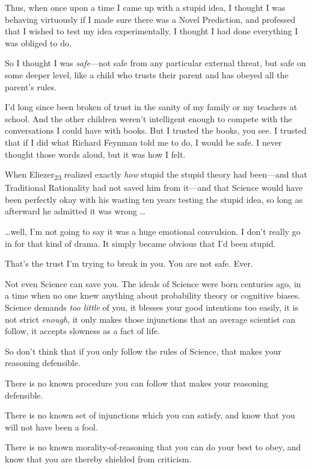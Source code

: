 {
 Thus, when once upon a time I came up with a stupid idea, I
thought I was behaving virtuously if I made sure there was a Novel
Prediction, and professed that I wished to test my idea experimentally.
I thought I had done everything I was obliged to do.}

{
 So I thought I was \textit{safe}{}---not safe from any particular
external threat, but safe on some deeper level, like a child who trusts
their parent and has obeyed all the parent's rules.}

{
 I'd long since been broken of trust in the sanity
of my family or my teachers at school. And the other children
weren't intelligent enough to compete with the
conversations I could have with books. But I trusted the books, you
see. I trusted that if I did what Richard Feynman told me to do, I
would be safe. I never thought those words aloud, but it was how I
felt.}

{
 When Eliezer\textsubscript{23} realized exactly \textit{how}
stupid the stupid theory had been---and that Traditional Rationality
had not saved him from it---and that Science would have been perfectly
okay with his wasting ten years testing the stupid idea, so long as
afterward he admitted it was wrong \ldots}

{
 \ldots well, I'm not going to say it was a huge
emotional convulsion. I don't really go in for that
kind of drama. It simply became obvious that I'd been
stupid.}

{
 That's the trust I'm trying to
break in you. You are not safe. Ever.}

{
 Not even Science can save you. The ideals of Science were born
centuries ago, in a time when no one knew anything about probability
theory or cognitive biases. Science demands \textit{too little} of you,
it blesses your good intentions too easily, it is not strict
\textit{enough}, it only makes those injunctions that an average
scientist can follow, it accepts slowness as a fact of life.}

{
 So don't think that if you only follow the rules
of Science, that makes your reasoning defensible.}

{
 There is no known procedure you can follow that makes your
reasoning defensible.}

{
 There is no known set of injunctions which you can satisfy, and
know that you will not have been a fool.}

{
 There is no known morality-of-reasoning that you can do your best
to obey, and know that you are thereby shielded from criticism.}

